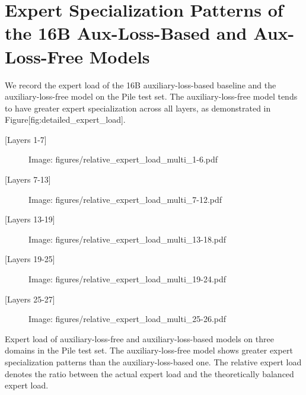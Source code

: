 \documentclass[11pt,a4paper]{article}
\begin{document}
\section{Expert Specialization Patterns of the 16B Aux-Loss-Based and Aux-Loss-Free Models}

We record the expert load of the 16B auxiliary-loss-based baseline and the auxiliary-loss-free model on the Pile test set. 
The auxiliary-loss-free model tends to have greater expert specialization across all layers, as demonstrated in Figure[fig:detailed\_expert\_load].

[Layers 1-7]

\begin{figure}[h]
\caption{Image: figures/relative\_expert\_load\_multi\_1-6.pdf}
\end{figure}

[Layers 7-13]

\begin{figure}[h]
\caption{Image: figures/relative\_expert\_load\_multi\_7-12.pdf}
\end{figure}

[Layers 13-19]

\begin{figure}[h]
\caption{Image: figures/relative\_expert\_load\_multi\_13-18.pdf}
\end{figure}

[Layers 19-25]

\begin{figure}[h]
\caption{Image: figures/relative\_expert\_load\_multi\_19-24.pdf}
\end{figure}

[Layers 25-27]

\begin{figure}[h]
\caption{Image: figures/relative\_expert\_load\_multi\_25-26.pdf}
\end{figure}

Expert load of auxiliary-loss-free and auxiliary-loss-based models on three domains in the Pile test set. 
 The auxiliary-loss-free model shows greater expert specialization patterns than the auxiliary-loss-based one.
 The relative expert load denotes the ratio between the actual expert load and the theoretically balanced expert load.
\end{document}
